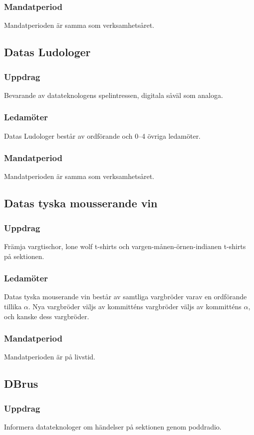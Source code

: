 \subsubsection{Mandatperiod}
Mandatperioden är samma som verksamhetsåret. 

\subsection{Datas Ludologer}
\subsubsection{Uppdrag}
Bevarande av datateknologens spelintressen, digitala såväl som analoga.
\subsubsection{Ledamöter}
Datas Ludologer består av ordförande och 0--4 övriga ledamöter.
\subsubsection{Mandatperiod}
Mandatperioden är samma som verksamhetsåret. 

\subsection{Datas tyska mousserande vin}
\subsubsection{Uppdrag}
Främja vargtischor, lone wolf t-shirts och vargen-månen-örnen-indianen t-shirts på sektionen.
\subsubsection{Ledamöter}
Datas tyska mouserande vin består av samtliga vargbröder varav en ordförande tillika $\alpha$. Nya vargbröder väljs av kommitténs vargbröder väljs av kommitténs $\alpha$, och kanske dess vargbröder.
\subsubsection{Mandatperiod}
Mandatperioden är på livstid.

\subsection{DBrus}
\subsubsection{Uppdrag}
Informera datateknologer om händelser på sektionen genom poddradio.

